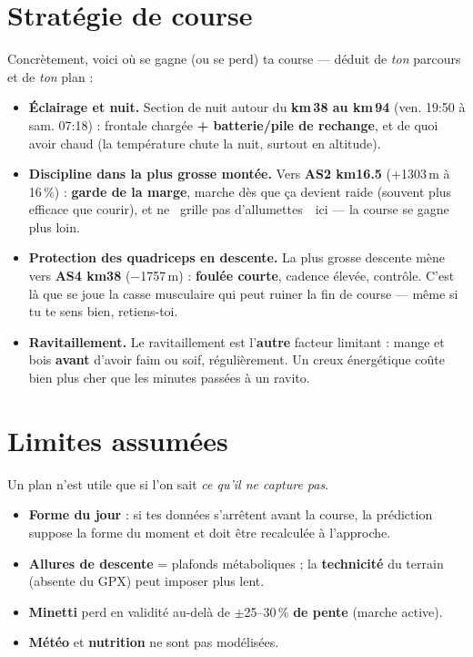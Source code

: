 \documentclass{locomotionreport}
\begin{document}
\section{Strat\'egie de course}
Concr\`etement, voici o\`u se gagne (ou se perd) ta course --- d\'eduit de \emph{ton} parcours et de
\emph{ton} plan :
\begin{itemize}[leftmargin=1.4em]
\item \textbf{\'Eclairage et nuit.} Section de nuit autour du \textbf{km\,38 au km\,94} (ven. 19:50 \`a sam. 07:18) : frontale charg\'ee \textbf{+ batterie/pile de rechange}, et de quoi avoir chaud (la temp\'erature chute la nuit, surtout en altitude).
\item \textbf{Discipline dans la plus grosse mont\'ee.} Vers \textbf{AS2 km16.5} (+1303\,m \`a 16\,\%) : \textbf{garde de la marge}, marche d\`es que \c{c}a devient raide (souvent plus efficace que courir), et ne \og~grille pas d'allumettes~\fg\ ici — la course se gagne plus loin.
\item \textbf{Protection des quadriceps en descente.} La plus grosse descente m\`ene vers \textbf{AS4 km38} ($-$1757\,m) : \textbf{foul\'ee courte}, cadence \'elev\'ee, contr\^ole. C'est l\`a que se joue la casse musculaire qui peut ruiner la fin de course — m\^eme si tu te sens bien, retiens-toi.
\item \textbf{Ravitaillement.} Le ravitaillement est l'\textbf{autre} facteur limitant : mange et bois \textbf{avant} d'avoir faim ou soif, r\'eguli\`erement. Un creux \'energ\'etique co\^ute bien plus cher que les minutes pass\'ees \`a un ravito.
\end{itemize}

\section{Limites assum\'ees}
Un plan n'est utile que si l'on sait \emph{ce qu'il ne capture pas}.
\begin{llattention}
\begin{itemize}[leftmargin=1.4em]
\item \textbf{Forme du jour} : si tes donn\'ees s'arr\^etent avant la course, la pr\'ediction suppose la
forme du moment et doit \^etre recalcul\'ee \`a l'approche.
\item \textbf{Allures de descente} = plafonds m\'etaboliques ; la \textbf{technicit\'e} du terrain (absente
du GPX) peut imposer plus lent.
\item \textbf{Minetti} perd en validit\'e au-del\`a de \(\pm\)25--30\,\% \textbf{de pente} (marche active).
\item \textbf{M\'et\'eo} et \textbf{nutrition} ne sont pas mod\'elis\'ees.
\end{itemize}
\end{llattention}
\end{document}
